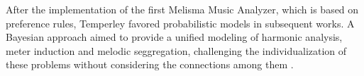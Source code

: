 



After the implementation of the first Melisma Music
Analyzer, which is based on preference rules, Temperley
favored probabilistic models in subsequent works. A Bayesian
approach aimed to provide a unified modeling of harmonic
analysis, meter induction and melodic seggregation,
challenging the individualization of these problems without
considering the connections among them
\cite{temperley2009unified}.


